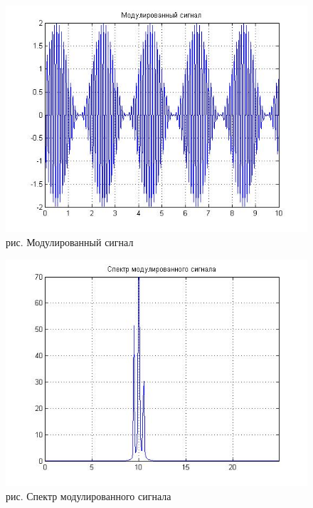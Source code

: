 \documentclass[10pt,a4paper]{report}
\begin{document}
\begin{figure}
\begin{center}
\includegraphics[angle=0, scale = 0.6]{7_3.jpg}\newline
рис. Модулированный сигнал\newline
\end{center}
\end{figure}
\begin{figure}
\begin{center}
\includegraphics[angle=0, scale = 0.6]{7_4.jpg}\newline
рис. Спектр модулированного сигнала\newline
\end{center}
\end{figure}
\end{document}
